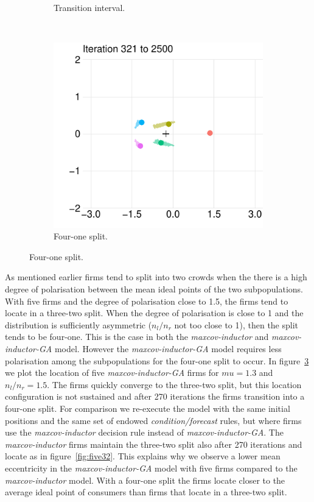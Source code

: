 \documentclass[preprint, 12pt]{elsarticle}
\begin{document}
\begin{figure}[hb!]
\begin{subfigure}[t]{0.315\textwidth}
		\caption{Transition interval.}
		\label{fig:fivetransition}
	\end{subfigure}
	~
	\begin{subfigure}[t]{0.315\textwidth}
		\centering
		\includegraphics[width=\textwidth, trim={6mm 0 2mm 0}]{Graphics/fig6m_miga3.pdf}
		\caption{Four-one split.}
		\label{fig:five41}
	\end{subfigure}
	
	\label{fig:five}
\end{figure}

As mentioned earlier firms tend to split into two crowds when the there is a high degree of polarisation between the mean ideal points of the two subpopulations. With five firms and the degree of polarisation close to 1.5, the firms tend to locate in a three-two split. When the degree of polarisation is close to 1 and the distribution is sufficiently asymmetric ($n_l/n_r$ not too close to 1), then the split tends to be four-one. This is the case in both the \emph{maxcov-inductor} and \emph{maxcov-inductor-GA} model. However the \emph{maxcov-inductor-GA} model requires less polarisation among the subpopulations for the four-one split to occur. In figure~\ref{fig:five} we plot the location of five \emph{maxcov-inductor-GA} firms for $mu = 1.3$ and $n_l/n_r = 1.5$. The firms quickly converge to the three-two split, but this location configuration is not sustained and after 270 iterations the firms transition into a four-one split. For comparison we re-execute the model with the same initial positions and the same set of endowed \emph{condition/forecast} rules, but where firms use the \emph{maxcov-inductor} decision rule instead of \emph{maxcov-inductor-GA}. The \emph{maxcov-inductor} firms maintain the three-two split also after 270 iterations and locate as in figure~\ref{fig:five32}. This explains why we observe a lower mean eccentricity in the \emph{maxcov-inductor-GA} model with five firms compared to the \emph{maxcov-inductor} model. With a four-one split the firms locate closer to the average ideal point of consumers than firms that locate in a three-two split.
\end{document}
